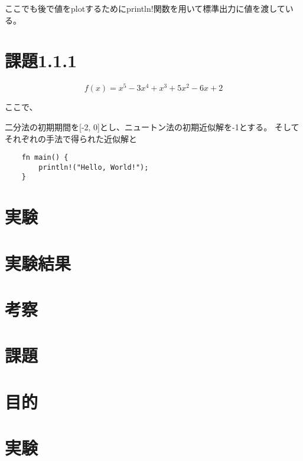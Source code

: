 \documentclass[uplatex, 11pt,a4j, titlepage]{jsarticle}
\begin{document}
ここでも後で値をplotするためにprintln!関数を用いて標準出力に値を渡している。


\section{課題1.1.1}
\begin{equation}
    f(x) = x^5 - 3 x^4 + x^3 + 5 x^2 - 6x + 2 
\end{equation}

ここで、

二分法の初期期間を[-2, 0]とし、ニュートン法の初期近似解を-1とする。
そしてそれぞれの手法で得られた近似解と

\begin{lstlisting}
    fn main() {
        println!("Hello, World!");
    }
\end{lstlisting}

\section{実験}
\section{実験結果}
\section{考察}
\section{課題}


\newpage
\resetcounters


\subtitle{2020/10/*}

\section{目的}
\section{実験}
\end{document}
